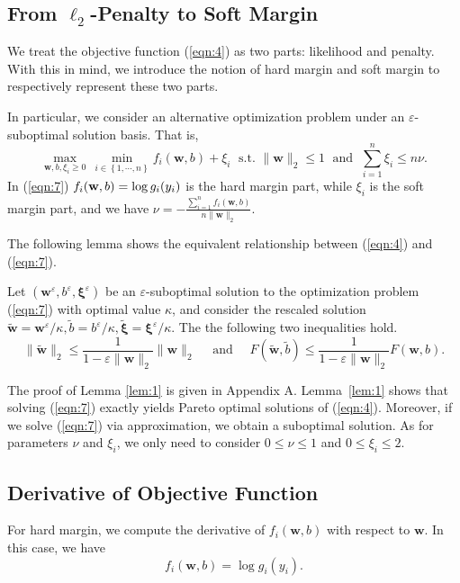 \documentclass{llncs}
\newcommand{\bw}{\mathbf{w}}
\newcommand{\bwep}{\mathbf{w}^{\varepsilon}}
\newcommand{\bwfly}{\tilde{\mathbf{w}}}
\newcommand{\bxi}{\mathbf{\xi}}
\newcommand{\lc}{\left(}
\newcommand{\rc}{\right)}
\def\w{{\bf w}}
\begin{document}
\subsection{From $\ell_2$-Penalty to Soft Margin}	

We treat the objective function (\ref{eqn:4}) as two parts: likelihood and penalty. With this in mind, we introduce the notion of hard margin and soft margin to respectively represent these two parts.

In particular, we consider an alternative optimization problem under an $\varepsilon$-suboptimal solution basis. That is,
\begin{equation} \label{eqn:7}
\max_{\bw ,b,\xi_i\geq 0 } \, \min_{i\in\left\{1, \cdots, n\right\}}  f_i\lc \bw, b \rc + \xi_i \;  \mbox{ s.t. } \|\bw\|_2 \leq 1 \;  \mbox{ and } \; \sum_{i=1}^{n}\xi_i\leq n\nu.
\end{equation}
In (\ref{eqn:7}) $f_i(\w, b) = \log g_i(y_i)$ is the hard margin part, while $\xi_i$ is the soft margin part, and we have $\nu = -\frac{\sum_{i=1}^{n}f_i\lc \bw, b \rc}{n\|\bw\|_2}$.
	
The following lemma shows the equivalent relationship between (\ref{eqn:4}) and (\ref{eqn:7}).

\begin{lemma} \label{lem:1}
	Let $(\bwep, b^{\varepsilon},\bxi^\varepsilon)$ be an $\varepsilon$-suboptimal solution to the optimization problem (\ref{eqn:7}) with optimal value $\kappa$, and
	consider the rescaled solution $\bwfly=\bwep /\kappa,\tilde{b}=b^{\varepsilon}/\kappa,\tilde{\bxi}=\bxi^\varepsilon /\kappa$.
The the following two inequalities hold.
	\[
	\|\bwfly\|_2\leq \frac{1}{1-\varepsilon\|\bw\|_2}\|\bw\|_2 \quad \mbox{ and } \quad F\lc \bwfly, \tilde{b} \rc \leq \frac{1}{1-\varepsilon\|\bw\|_2} F\lc \bw, b \rc.
	\]
\end{lemma}

The proof of Lemma \ref{lem:1} is given in Appendix A.
Lemma~\ref{lem:1} shows that solving (\ref{eqn:7}) exactly yields Pareto optimal solutions of (\ref{eqn:4}).
Moreover, if we solve (\ref{eqn:7}) via approximation, we obtain a suboptimal solution.
As for parameters $\nu$ and $\xi_i$, we only need to consider $0\leq\nu\leq1$ and $0\leq\xi_i\leq2$.
	
\subsection{Derivative of Objective Function}
	
For hard margin, we compute the derivative  of $f_i(\bw,b)$ with respect to $\bw$.
In this case, we have
	\begin{equation} \label{eqn:10}
	f_i (\bw, b) = \log g_i(y_i).
	\end{equation}
\end{document}
